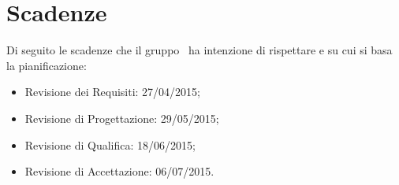 \section{Scadenze}{
\label{sec:scadenze}
Di seguito le scadenze che il gruppo \gruppo\ ha intenzione di rispettare e su cui si basa la pianificazione:
\begin{itemize}
	\item Revisione dei Requisiti: 27/04/2015;
	\item Revisione di Progettazione: 29/05/2015;
	\item Revisione di Qualifica: 18/06/2015;
	\item Revisione di Accettazione: 06/07/2015.
\end{itemize}
}